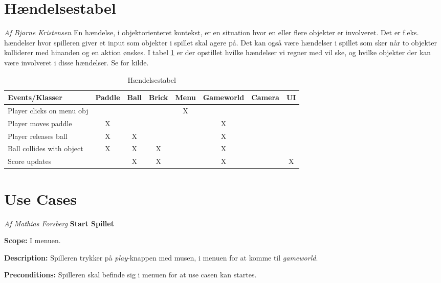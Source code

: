 \section{Hændelsestabel}
\textit{Af Bjarne Kristensen}\newline
En hændelse, i objektorienteret kontekst, er en situation hvor en eller flere objekter er involveret. Det er f.eks. hændelser hvor spilleren giver et input som objekter i spillet skal agere på. Det kan også være hændelser i spillet som sker når to objekter kolliderer med hinanden og en aktion ønskes. I tabel \ref{eventtabel} er der opstillet hvilke hændelser vi regner med vil ske, og hvilke objekter der kan være involveret i disse hændelser.\newline
\newline
Se \cite[chap. 3]{Mathiassen200006} for kilde.
\begin{table}[]
\centering
\caption{Hændelsestabel}
\label{eventtabel}
\begin{tabular}{|l|c|c|c|c|c|c|c|}
\hline
Events/Klasser & Paddle & Ball & Brick & Menu & Gameworld & Camera & UI \\ \hline
Player clicks on menu obj &  &  &  & X &  &  &  \\ \hline
Player moves paddle & X &  &  &  & X &  &  \\ \hline
Player releases ball & X & X &  &  & X &  &  \\ \hline
Ball collides with object & X & X & X &  & X &  &  \\ \hline
Score updates &  & X & X &  & X &  & X \\ \hline
\end{tabular}
\end{table}

\section{Use Cases}
\textit{Af Mathias Forsberg}\newline
\textbf{Start Spillet}\newline

\textbf{Scope:}\newline
I menuen.\newline

\textbf{Description:} \newline
Spilleren trykker på \textit{play}-knappen med musen, i menuen for at komme til \textit{gameworld}. \newline

\textbf{Preconditions:}\newline
Spilleren skal befinde sig i menuen for at use casen kan startes.\newline

